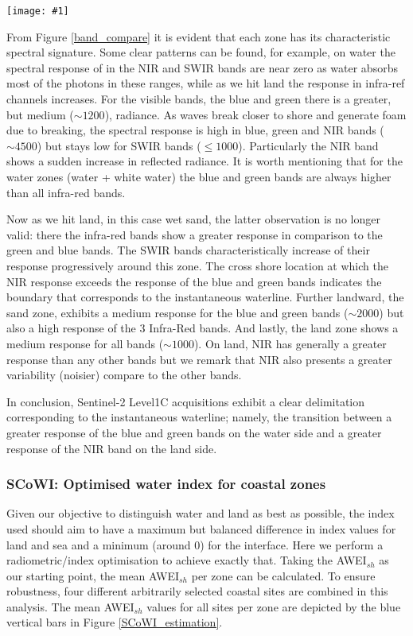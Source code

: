 \documentclass[remotesensing,article,submit,pdftex,moreauthors]{Definitions/mdpi}
\newcommand{\myfigure}[4]{
    \begin{figure*}[ht!]
        \centering
        \texttt{[image: \#1]}	 
        \caption{\itshape#2}
        \label{#3}
    \end{figure*} 
}
\begin{document}
\myfigure{img/band_compare_CAPBRETON_new2.png}{Example of the spectral response along the 5 cross shore zones intersected by the red transect. The cross-shore distance origin is set on the red cross. The instantaneous waterline (land/water limit marker) is our target here.}{band_compare}{1}

From Figure \ref{band_compare} it is evident that each zone has its characteristic spectral signature. Some clear patterns can be found, for example, on water the spectral response of in the NIR and SWIR bands are near zero as water absorbs most of the photons in these ranges, while as we hit land the response in infra-ref channels increases. For the visible bands, the blue and green there is a greater, but medium ($\sim 1200$), radiance. As waves break closer to shore and generate foam due to breaking, the spectral response is high in blue, green and NIR bands ($\sim 4500$) but stays low for SWIR bands ($\le 1000$). Particularly the NIR band shows a sudden increase in reflected radiance. It is worth mentioning that for the water zones (water + white water) the blue and green bands are always higher than all infra-red bands. 

Now as we hit land, in this case wet sand, the latter observation is no longer valid: there the  infra-red bands show a greater response in comparison to the green and blue bands. The SWIR bands characteristically increase of their response progressively around this zone. The cross shore location at which the NIR response exceeds the response of the blue and green bands indicates the boundary that corresponds to the instantaneous waterline. Further landward, the sand zone, exhibits a medium response for the blue and green bands ($\sim 2000$) but also a high response of the 3 Infra-Red bands. And lastly, the land zone shows a medium response for all bands ($\sim 1000$). On land, NIR has generally a greater response than any other bands but we remark that NIR also presents a greater variability (noisier) compare to the other bands.

In conclusion, Sentinel-2 Level1C acquisitions exhibit a clear delimitation corresponding to the instantaneous waterline; namely, the transition between a greater response of the blue and green bands on the water side and a greater response of the NIR band on the land side.

\subsubsection{SCoWI: Optimised water index for coastal zones}\label{SCOWI_sec}
Given our objective to distinguish water and land as best as possible, the index used should aim to have a maximum but balanced difference in index values for land and sea and a minimum (around 0) for the interface. Here we perform a radiometric/index optimisation to achieve exactly that. Taking the AWEI$_{sh}$ as our starting point, the mean AWEI$_{sh}$ per zone can be calculated. To ensure robustness, four different arbitrarily selected coastal sites are combined in this analysis. The mean AWEI$_{sh}$ values for all sites per zone are depicted by the blue vertical bars in Figure \ref{SCoWI_estimation}. 
\end{document}
